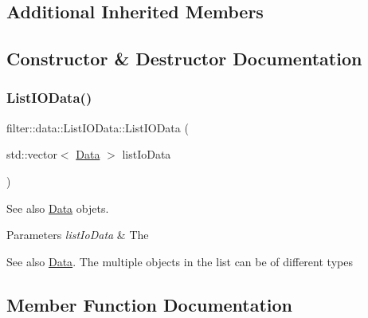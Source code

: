 \subsection*{Additional Inherited Members}


\subsection{Constructor \& Destructor Documentation}
\mbox{\label{classfilter_1_1data_1_1_list_i_o_data_a60486a441c50cb2e16386fdb7310c901}} 
\subsubsection{\texorpdfstring{List\+I\+O\+Data()}{ListIOData()}}
{\footnotesize\ttfamily filter\+::data\+::\+List\+I\+O\+Data\+::\+List\+I\+O\+Data (\begin{DoxyParamCaption}\item[{std\+::vector$<$ \hyperlink{classfilter_1_1data_1_1_data}{Data} $>$}]{list\+Io\+Data }\end{DoxyParamCaption})\hspace{0.3cm}{\ttfamily [inline]}}

\begin{DoxySeeAlso}{See also}
\hyperlink{classfilter_1_1data_1_1_data}{Data} objets. 
\end{DoxySeeAlso}

\begin{DoxyParams}{Parameters}
{\em list\+Io\+Data} & The \\
\hline
\end{DoxyParams}
\begin{DoxySeeAlso}{See also}
\hyperlink{classfilter_1_1data_1_1_data}{Data}. The multiple objects in the list can be of different types 
\end{DoxySeeAlso}


\subsection{Member Function Documentation}
\mbox{\label{classfilter_1_1data_1_1_list_i_o_data_a353fa855f51b511b3afa53f2dac6e0f3}} 
